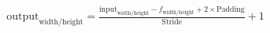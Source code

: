 \documentclass[preview]{standalone}
\begin{document}
\begin{align*}
\text{output}_{\text{width}/\text{height}} = \frac{\text{input}_{\text{width}/\text{height}} - f_{\text{width}/\text{height}} + 2\times \text{Padding}}{\text{Stride}} + 1
\end{align*}
\end{document}
